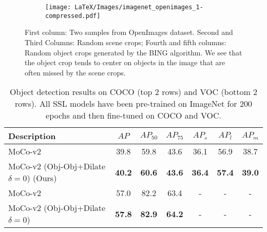 \begin{figure*}[h!]
  \centering
  \begin{subfigure}{\linewidth}
    \texttt{[image: LaTeX/Images/imagenet\_openimages\_1-compressed.pdf]}
  \end{subfigure}
  \caption{First column: Two samples from OpenImages dataset. Second and Third Columns: Random scene crops; Fourth and fifth columns: Random object crops generated by the BING \citep{Cheng2014BINGBN} algorithm. We see that the object crop tends to center on objects in the image that are often missed by the scene crops.}
  \label{fig:imagenet_openimages_figure}
\end{figure*}


\begin{table*}
    \centering
    \begin{tabu} to \linewidth {lcccccc} 
        \toprule
        Description & $AP$ & $AP_{50}$ & $AP_{75}$ & $AP_{s}$ & $AP_{l}$ & $AP_{m}$\\
        
    
     \midrule
    MoCo-v2 & 39.8 & 59.8 & 43.6 & 36.1 & 56.9 & 38.7\\
    
   
   
    MoCo-v2 (Obj-Obj+Dilate $\delta=0$) (Ours)  & \textbf{40.2} & \textbf{60.6} & \textbf{43.6} & \textbf{36.4} & \textbf{57.4} & \textbf{39.0}\\
    \midrule
    MoCo-v2 &  57.0 & 82.2 & 63.4 & - & - & -\\
    MoCo-v2 (Obj-Obj+Dilate $\delta=0$) &  \textbf{57.8} &  \textbf{82.9} & \textbf{64.2} & - & - & -\\
        \bottomrule
    \end{tabu}
    \caption{Object detection results on COCO (top 2 rows) and VOC (bottom 2 rows). All SSL models have been pre-trained on ImageNet for 200 epochs and then fine-tuned on COCO and VOC.}
    \label{tab:imagenet_results}
\end{table*}

